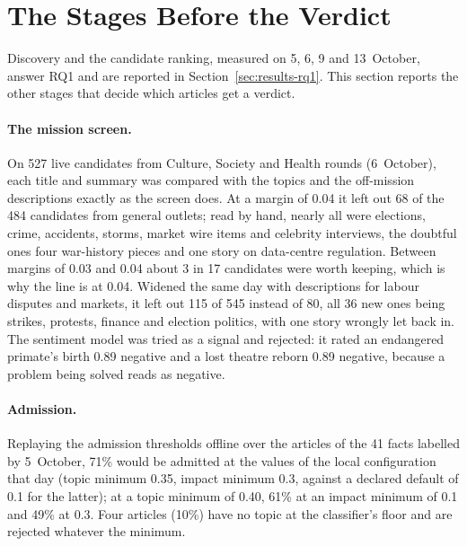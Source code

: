 
\section{The Stages Before the Verdict}
\label{sec:results-pre-verdict}

Discovery and the candidate ranking, measured on 5, 6, 9 and
13~October, answer RQ1 and are reported in
Section~\ref{sec:results-rq1}. This section reports the other stages
that decide which articles get a verdict.

\paragraph{The mission screen.} On 527 live candidates from Culture,
Society and Health rounds (6~October), each title and summary was
compared with the topics and the off-mission descriptions exactly as
the screen does. At a margin of 0.04 it left out 68 of the 484
candidates from general outlets; read by hand, nearly all were
elections, crime, accidents, storms, market wire items and celebrity
interviews, the doubtful ones four war-history pieces and one story on
data-centre regulation. Between margins of 0.03 and 0.04 about 3 in 17
candidates were worth keeping, which is why the line is at 0.04.
Widened the same day with descriptions for labour disputes and
markets, it left out 115 of 545 instead of 80, all 36 new ones being
strikes, protests, finance and election politics, with one story wrongly
let back in. The sentiment model was tried as a signal and rejected: it
rated an endangered primate's birth 0.89 negative and a lost theatre
reborn 0.89 negative, because a problem being solved reads as negative.

\paragraph{Admission.} Replaying the admission thresholds offline over
the articles of the 41 facts labelled by 5~October, 71\% would be
admitted at the values of the local configuration that day (topic
minimum 0.35, impact minimum 0.3, against a declared default of 0.1 for
the latter); at a topic minimum of 0.40, 61\% at an impact minimum of
0.1 and 49\% at 0.3. Four articles (10\%) have no topic at the
classifier's floor and are rejected whatever the minimum.

